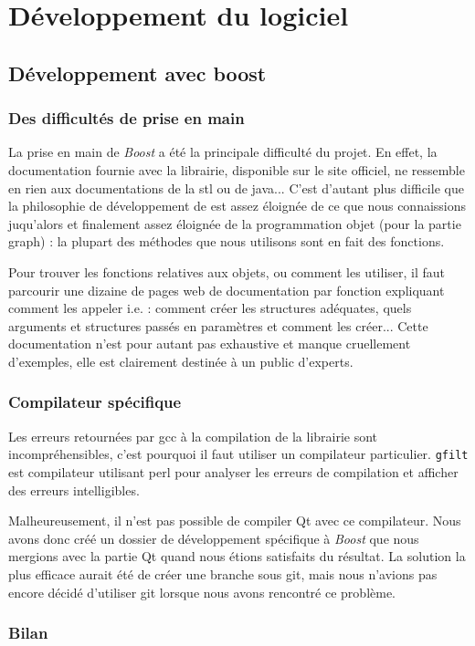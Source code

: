 \section{Développement du logiciel}
\subsection{Développement avec boost}
\subsubsection{Des difficultés de prise en main}
La prise en main de \textit{Boost} a été la principale difficulté du projet. En effet, la documentation fournie avec la librairie, disponible sur le site officiel, ne ressemble en rien aux documentations de la stl ou de java... C'est d'autant plus difficile que la philosophie de développement de \boost est assez éloignée de ce que nous connaissions juqu'alors et finalement assez éloignée de la programmation objet (pour la partie graph) : la plupart des méthodes que nous utilisons sont en fait des fonctions.

Pour trouver les fonctions relatives aux objets, ou comment les utiliser, il faut parcourir une dizaine de pages web de documentation par fonction expliquant comment les appeler i.e. : comment créer les structures adéquates, quels arguments et structures passés en paramètres et comment les créer... Cette documentation n'est pour autant pas exhaustive et manque cruellement d'exemples, elle est clairement destinée à un public d'experts.

\subsubsection {Compilateur spécifique}
Les erreurs retournées par gcc à la compilation de la librairie sont incompréhensibles, c'est pourquoi il faut utiliser un compilateur particulier. \verb|gfilt| est compilateur utilisant perl pour analyser les erreurs de compilation et afficher des erreurs intelligibles. 

Malheureusement, il n'est pas possible de compiler Qt avec ce compilateur. Nous avons donc créé un dossier de développement spécifique à \textit{Boost} que nous mergions avec la partie Qt quand nous étions satisfaits du résultat. La solution la plus efficace aurait été de créer une branche sous git, mais nous n'avions pas encore décidé d'utiliser git lorsque nous avons rencontré ce problème.

\subsubsection{Bilan}

